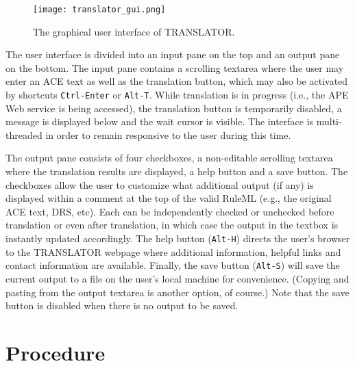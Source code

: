 \documentclass[12pt]{report}
\begin{document}
\begin{figure}[htbp]
	\begin{center}
	  \texttt{[image: translator\_gui.png]}
	\caption{The graphical user interface of TRANSLATOR.}
	\label{fig:gui}
	\end{center}
\end{figure}

The user interface is divided into an input pane on the top and an output pane on the bottom. The input pane contains a scrolling textarea where the user may enter an ACE text as well as the translation button, which may also be activated by shortcuts \verb|Ctrl-Enter| or \verb|Alt-T|. While translation is in progress (i.e., the APE Web service is being accessed), the translation button is temporarily disabled, a message is displayed below and the wait cursor is visible. The interface is multi-threaded in order to remain responsive to the user during this time.

The output pane consists of four checkboxes, a non-editable scrolling textarea where the translation results are displayed, a help button and a save button. The checkboxes allow the user to customize what additional output (if any) is displayed within a comment at the top of the valid RuleML (e.g., the original ACE text, DRS, etc). Each can be independently checked or unchecked before translation or even after translation, in which case the output in the textbox is instantly updated accordingly. The help button (\verb|Alt-H|) directs the user's browser to the TRANSLATOR webpage where additional information, helpful links and contact information are available. Finally, the save button (\verb|Alt-S|) will save the current output to a file on the user's local machine for convenience. (Copying and pasting from the output textarea is another option, of course.) Note that the save button is disabled when there is no output to be saved.

\section{Procedure}
\end{document}
